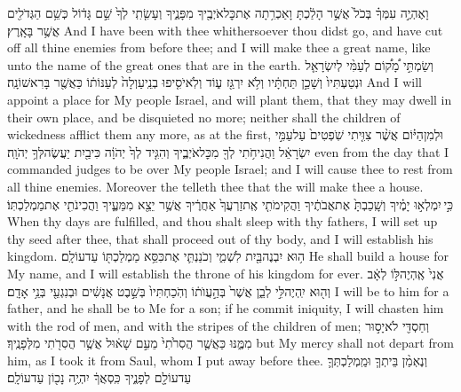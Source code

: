 {וָאֶהְיֶ֣ה עִמְּךָ֗ בְּכֹל֙ אֲשֶׁ֣ר הָלַ֔כְתָּ וָאַכְרִ֥תָה אֶת\maqqaf כׇּל\maqqaf אֹיְבֶ֖יךָ מִפָּנֶ֑יךָ וְעָשִׂ֤תִֽי לְךָ֙ שֵׁ֣ם גָּד֔וֹל כְּשֵׁ֥ם הַגְּדֹלִ֖ים אֲשֶׁ֥ר בָּאָֽרֶץ׃}
{And I have been with thee whithersoever thou didst go, and have cut off all thine enemies from before thee; and I will make thee a great name, like unto the name of the great ones that are in the earth.}
{וְשַׂמְתִּ֣י מָ֠ק֠וֹם לְעַמִּ֨י לְיִשְׂרָאֵ֤ל וּנְטַעְתִּיו֙ וְשָׁכַ֣ן תַּחְתָּ֔יו וְלֹ֥א יִרְגַּ֖ז ע֑וֹד וְלֹֽא\maqqaf יֹסִ֤יפוּ בְנֵֽי\maqqaf עַוְלָה֙ לְעַנּוֹת֔וֹ כַּאֲשֶׁ֖ר בָּרִאשׁוֹנָֽה׃}
{And I will appoint a place for My people Israel, and will plant them, that they may dwell in their own place, and be disquieted no more; neither shall the children of wickedness afflict them any more, as at the first,}
{וּלְמִן\maqqaf הַיּ֗וֹם אֲשֶׁ֨ר צִוִּ֤יתִי שֹֽׁפְטִים֙ עַל\maqqaf עַמִּ֣י יִשְׂרָאֵ֔ל וַהֲנִיחֹ֥תִי לְךָ֖ מִכׇּל\maqqaf אֹיְבֶ֑יךָ וְהִגִּ֤יד לְךָ֙ יְהֹוָ֔ה כִּי\maqqaf בַ֖יִת יַעֲשֶׂה\maqqaf לְּךָ֥ יְהֹוָֽה׃}
{even from the day that I commanded judges to be over My people Israel; and I will cause thee to rest from all thine enemies. Moreover the \lord\space telleth thee that the \lord\space will make thee a house.}
{כִּ֣י \legarmeh  יִמְלְא֣וּ יָמֶ֗יךָ וְשָֽׁכַבְתָּ֙ אֶת\maqqaf אֲבֹתֶ֔יךָ וַהֲקִימֹתִ֤י אֶֽת\maqqaf זַרְעֲךָ֙ אַחֲרֶ֔יךָ אֲשֶׁ֥ר יֵצֵ֖א מִמֵּעֶ֑יךָ וַהֲכִינֹתִ֖י אֶת\maqqaf מַמְלַכְתּֽוֹ׃}
{When thy days are fulfilled, and thou shalt sleep with thy fathers, I will set up thy seed after thee, that shall proceed out of thy body, and I will establish his kingdom.}
{ה֥וּא יִבְנֶה\maqqaf בַּ֖יִת לִשְׁמִ֑י וְכֹנַנְתִּ֛י אֶת\maqqaf כִּסֵּ֥א מַמְלַכְתּ֖וֹ עַד\maqqaf עוֹלָֽם׃}
{He shall build a house for My name, and I will establish the throne of his kingdom for ever.}
{אֲנִי֙ אֶֽהְיֶה\maqqaf לּ֣וֹ לְאָ֔ב וְה֖וּא יִֽהְיֶה\maqqaf לִּ֣י לְבֵ֑ן אֲשֶׁר֙ בְּהַ֣עֲוֺת֔וֹ וְהֹֽכַחְתִּיו֙ בְּשֵׁ֣בֶט אֲנָשִׁ֔ים וּבְנִגְעֵ֖י בְּנֵ֥י אָדָֽם׃}
{I will be to him for a father, and he shall be to Me for a son; if he commit iniquity, I will chasten him with the rod of men, and with the stripes of the children of men;}
{וְחַסְדִּ֖י לֹא\maqqaf יָס֣וּר מִמֶּ֑נּוּ כַּאֲשֶׁ֤ר הֲסִרֹ֙תִי֙ מֵעִ֣ם שָׁא֔וּל אֲשֶׁ֥ר הֲסִרֹ֖תִי מִלְּפָנֶֽיךָ׃}
{but My mercy shall not depart from him, as I took it from Saul, whom I put away before thee.}
{וְנֶאְמַ֨ן בֵּיתְךָ֧ וּמַֽמְלַכְתְּךָ֛ עַד\maqqaf עוֹלָ֖ם לְפָנֶ֑יךָ כִּֽסְאֲךָ֔ יִהְיֶ֥ה נָכ֖וֹן עַד\maqqaf עוֹלָֽם׃}
